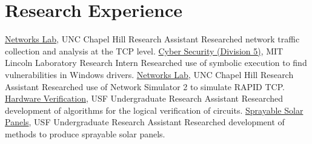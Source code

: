 \section{Research Experience}
		{\href{http://jayaikat.web.unc.edu/}{Networks Lab}, UNC Chapel Hill}
		{Research Assistant}
		{}{}
		{Researched network traffic collection and analysis at the TCP level.}
		{\href{https://www.ll.mit.edu/mission/cybersec/cybersec.html}{Cyber Security (Division 5)}, MIT Lincoln Laboratory}
		{Research Intern}
		{}{}
		{Researched use of symbolic execution to find vulnerabilities in Windows drivers.}
		{\href{http://www.cs.unc.edu/~jasleen/}{Networks Lab}, UNC Chapel Hill}
		{Research Assistant}
		{}{}
		{Researched use of Network Simulator 2 to simulate RAPID TCP.}
		{\href{http://www.csee.usf.edu/~haozheng/}{Hardware Verification}, USF}
		{Undergraduate Research Assistant}
		{}{}
		{Researched development of algorithms for the logical verification of circuits.}
		{\href{http://shell.cas.usf.edu/~xjiang/}{Sprayable Solar Panels}, USF}
		{Undergraduate Research Assistant}
		{}{}
		{Researched development of methods to produce sprayable solar panels.}